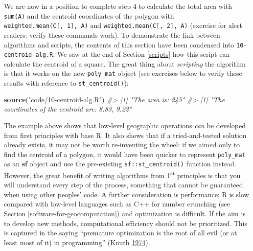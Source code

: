 \documentclass[]{krantz}
\newenvironment{Shaded}{\begin{snugshade}}{\end{snugshade}}
\newcommand{\CommentTok}[1]{\textcolor[rgb]{0.37,0.37,0.37}{\textit{#1}}}
\newcommand{\KeywordTok}[1]{\textcolor[rgb]{0.27,0.27,0.27}{\textbf{#1}}}
\newcommand{\NormalTok}[1]{#1}
\newcommand{\StringTok}[1]{\textcolor[rgb]{0.5,0.5,0.5}{#1}}
\begin{document}
We are now in a position to complete step 4 to calculate the total area with \texttt{sum(A)} and the centroid coordinates of the polygon with \texttt{weighted.mean(C{[},\ 1{]},\ A)} and \texttt{weighted.mean(C{[},\ 2{]},\ A)} (exercise for alert readers: verify these commands work).
To demonstrate the link between algorithms and scripts, the contents of this section have been condensed into \texttt{10-centroid-alg.R}.
We saw at the end of Section \ref{scripts} how this script can calculate the centroid of a square.
The great thing about \emph{scripting} the algorithm is that it works on the new \texttt{poly\_mat} object (see exercises below to verify these results with reference to \texttt{st\_centroid()}):

\begin{Shaded}
\begin{Highlighting}[]
\KeywordTok{source}\NormalTok{(}\StringTok{"code/10-centroid-alg.R"}\NormalTok{)}
\CommentTok{#> [1] "The area is: 245"}
\CommentTok{#> [1] "The coordinates of the centroid are: 8.83, 9.22"}
\end{Highlighting}
\end{Shaded}

The example above shows that low-level geographic operations \emph{can} be developed from first principles with base R.
It also shows that if a tried-and-tested solution already exists, it may not be worth re-inventing the wheel:
if we aimed only to find the centroid of a polygon, it would have been quicker to represent \texttt{poly\_mat} as an \textbf{sf} object and use the pre-existing \texttt{sf::st\_centroid()} function instead.
However, the great benefit of writing algorithms from 1\textsuperscript{st} principles is that you will understand every step of the process, something that cannot be guaranteed when using other peoples' code.
A further consideration is performance: R is slow compared with low-level languages such as C++ for number crunching (see Section \ref{software-for-geocomputation}) and optimization is difficult.
If the aim is to develop new methods, computational efficiency should not be prioritized.
This is captured in the saying ``premature optimization is the root of all evil (or at least most of it) in programming'' (Knuth \protect\hyperlink{ref-knuth_computer_1974}{1974}).
\end{document}

